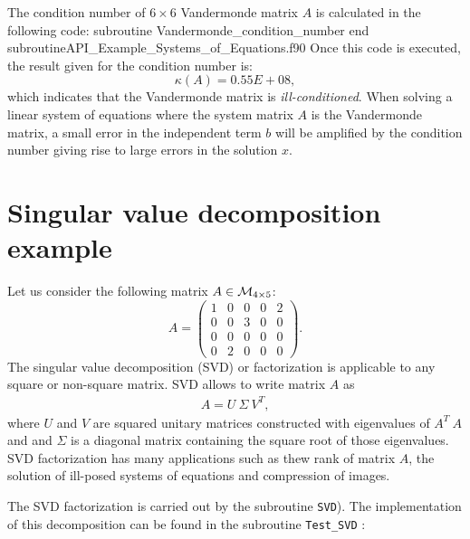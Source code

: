 The condition number of  $6\times6$ Vandermonde matrix $A$ is calculated in the following code: 
\vspace{0.5cm} 
{subroutine Vandermonde_condition_number}
{end subroutine}{API_Example_Systems_of_Equations.f90}
Once this code is executed, the result given for the condition number is:
\begin{equation*}
	\kappa(A)= 0.55E+08,
\end{equation*}
which indicates that the Vandermonde matrix is \textit{ill-conditioned}.
When solving a linear system of equations where the system matrix $A$ is the Vandermonde matrix, a small error in the independent term $b$ will be amplified by the condition number giving rise to 
large errors in the solution $x$. 

\section{Singular value decomposition example} 
 Let us consider the following matrix $A \in {\cal M}_{4 \times 5} $:
    \begin{equation}
    	A = \begin{pmatrix}
    	1 & 0 & 0 & 0 & 2 \\
    	0 & 0 & 3 & 0 & 0 \\
    	0 & 0 & 0 & 0 & 0 \\
    	0 & 2 & 0 & 0 & 0
    	\end{pmatrix}.
    \end{equation}
The singular value decomposition (SVD) or factorization is applicable to any square or non-square matrix. 
SVD allows to write  matrix $A$ as
   \begin{align*}
   	A = U \ \Sigma \ V^T,
   \end{align*}
where $U$ and $V$ are squared unitary matrices constructed with eigenvalues of $ A^T \ A $ and  
and $\Sigma$ is a diagonal matrix containing the square root of those eigenvalues.    
SVD  factorization has many applications such as thew rank of matrix $ A $,  the solution of ill-posed systems of equations 
and  compression of images.



The SVD factorization is carried out by the subroutine \verb|SVD|).
The implementation of this decomposition  can be found in the subroutine  \verb|Test_SVD| :
    
